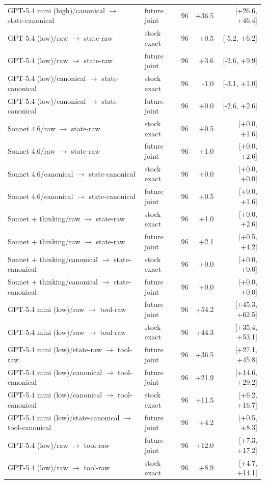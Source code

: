 \begin{table}[htbp]
{\begin{tabular}{lllrr}
GPT-5.4 mini (high)/canonical $\to$ state-canonical & future joint & 96 & +36.5 & [+26.6, +46.4] \\
GPT-5.4 (low)/raw $\to$ state-raw & stock exact & 96 & +0.5 & [-5.2, +6.2] \\
GPT-5.4 (low)/raw $\to$ state-raw & future joint & 96 & +3.6 & [-2.6, +9.9] \\
GPT-5.4 (low)/canonical $\to$ state-canonical & stock exact & 96 & -1.0 & [-3.1, +1.0] \\
GPT-5.4 (low)/canonical $\to$ state-canonical & future joint & 96 & +0.0 & [-2.6, +2.6] \\
Sonnet 4.6/raw $\to$ state-raw & stock exact & 96 & +0.5 & [+0.0, +1.6] \\
Sonnet 4.6/raw $\to$ state-raw & future joint & 96 & +1.0 & [+0.0, +2.6] \\
Sonnet 4.6/canonical $\to$ state-canonical & stock exact & 96 & +0.0 & [+0.0, +0.0] \\
Sonnet 4.6/canonical $\to$ state-canonical & future joint & 96 & +0.5 & [+0.0, +1.6] \\
Sonnet + thinking/raw $\to$ state-raw & stock exact & 96 & +1.0 & [+0.0, +2.6] \\
Sonnet + thinking/raw $\to$ state-raw & future joint & 96 & +2.1 & [+0.5, +4.2] \\
Sonnet + thinking/canonical $\to$ state-canonical & stock exact & 96 & +0.0 & [+0.0, +0.0] \\
Sonnet + thinking/canonical $\to$ state-canonical & future joint & 96 & +0.0 & [+0.0, +0.0] \\
GPT-5.4 mini (low)/raw $\to$ tool-raw & future joint & 96 & +54.2 & [+45.3, +62.5] \\
GPT-5.4 mini (low)/raw $\to$ tool-raw & stock exact & 96 & +44.3 & [+35.4, +53.1] \\
GPT-5.4 mini (low)/state-raw $\to$ tool-raw & future joint & 96 & +36.5 & [+27.1, +45.8] \\
GPT-5.4 mini (low)/canonical $\to$ tool-canonical & future joint & 96 & +21.9 & [+14.6, +29.2] \\
GPT-5.4 mini (low)/canonical $\to$ tool-canonical & stock exact & 96 & +11.5 & [+6.2, +16.7] \\
GPT-5.4 mini (low)/state-canonical $\to$ tool-canonical & future joint & 96 & +4.2 & [+0.5, +8.3] \\
GPT-5.4 (low)/raw $\to$ tool-raw & future joint & 96 & +12.0 & [+7.3, +17.2] \\
GPT-5.4 (low)/raw $\to$ tool-raw & stock exact & 96 & +8.9 & [+4.7, +14.1] \\

\end{tabular}}
\end{table}
